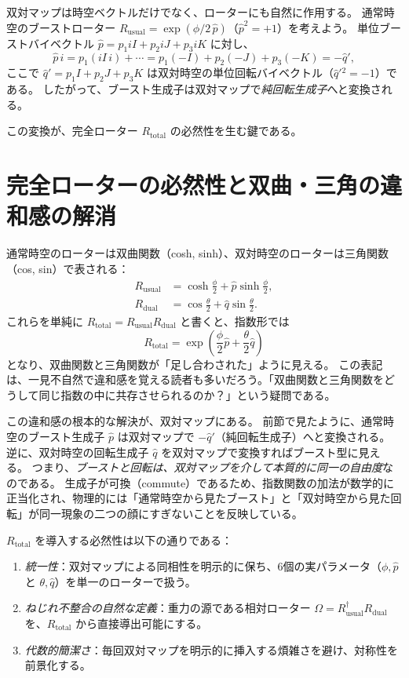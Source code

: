 \documentclass[dvipdfmx,a4paper]{jsbook}
\theoremstyle{definition}
\theoremstyle{remark}
\begin{document}
双対マップは時空ベクトルだけでなく、ローターにも自然に作用する。  
通常時空のブーストローター $R_\text{usual} = \exp(\phi/2 \, \hat{p})$（$\hat{p}^2 = +1$）を考えよう。  
単位ブーストバイベクトル $\hat{p} = p_1 iI + p_2 iJ + p_3 iK$ に対し、
\begin{equation}
  \hat{p} \, i = p_1 (iI \, i) + \cdots = p_1 (-I) + p_2 (-J) + p_3 (-K) = -\hat{q}',
\end{equation}
ここで $\hat{q}' = p_1 I + p_2 J + p_3 K$ は双対時空の単位回転バイベクトル（$\hat{q}'{}^2 = -1$）である。  
したがって、ブースト生成子は双対マップで\emph{純回転生成子}へと変換される。

この変換が、完全ローター $R_\text{total}$ の必然性を生む鍵である。

\section{完全ローターの必然性と双曲・三角の違和感の解消}
\label{sec:rtotal-necessity}

通常時空のローターは双曲関数（cosh, sinh）、双対時空のローターは三角関数（cos, sin）で表される：
\begin{align}
  R_\text{usual} &= \cosh\frac{\phi}{2} + \hat{p} \sinh\frac{\phi}{2}, \\
  R_\text{dual}   &= \cos\frac{\theta}{2}   + \hat{q} \sin\frac{\theta}{2}.
\end{align}
これらを単純に $R_\text{total} = R_\text{usual} R_\text{dual}$ と書くと、指数形では
\begin{equation}
  R_\text{total} = \exp\!\left( \frac{\phi}{2} \hat{p} + \frac{\theta}{2} \hat{q} \right)
\end{equation}
となり、双曲関数と三角関数が「足し合わされた」ように見える。  
この表記は、一見不自然で違和感を覚える読者も多いだろう。「双曲関数と三角関数をどうして同じ指数の中に共存させられるのか？」という疑問である。

この違和感の根本的な解決が、双対マップにある。  
前節で見たように、通常時空のブースト生成子 $\hat{p}$ は双対マップで $-\hat{q}'$（純回転生成子）へと変換される。  
逆に、双対時空の回転生成子 $\hat{q}$ を双対マップで変換すればブースト型に見える。  
つまり、\emph{ブーストと回転は、双対マップを介して本質的に同一の自由度}なのである。  
生成子が可換（commute）であるため、指数関数の加法が数学的に正当化され、物理的には「通常時空から見たブースト」と「双対時空から見た回転」が同一現象の二つの顔にすぎないことを反映している。

$R_\text{total}$ を導入する必然性は以下の通りである：
\begin{enumerate}
  \item \emph{統一性}：双対マップによる同相性を明示的に保ち、6個の実パラメータ（$\phi, \hat{p}$ と $\theta, \hat{q}$）を単一のローターで扱う。
  \item \emph{ねじれ不整合の自然な定義}：重力の源である相対ローター $\Omega = R_\text{usual}^\dagger R_\text{dual}$ を、$R_\text{total}$ から直接導出可能にする。
  \item \emph{代数的簡潔さ}：毎回双対マップを明示的に挿入する煩雑さを避け、対称性を前景化する。
\end{enumerate}
\end{document}
